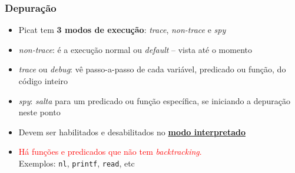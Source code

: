 \begin{frame}[fragile]

    \frametitle{Depuração}

    \begin{itemize}
    
      \item Picat tem \textbf{3 modos de execução}: \textit{trace},
      \textit{non-trace} e \textit{spy}
      \pause
      \item  \textit{non-trace}: é a execução normal ou \textit{default} -- vista até o momento

      \pause
      \item  \textit{trace} ou \textit{debug}: vê passo-a-passo de cada variável, predicado ou      função,  do código inteiro
      \pause
      \item \textit{spy}: \textit{salta} para um predicado ou função específica,
       se iniciando a depuração neste ponto

      \pause
      \item Devem ser habilitados e desabilitados no \underline{\textbf{modo interpretado}}
    
      \item \textcolor{red}{Há funções e predicados que não tem \textit{backtracking}.}\\
      \pause
       Exemplos: \texttt{nl}, \texttt{printf}, \texttt{read}, etc
       
    \end{itemize}
\end{frame}


